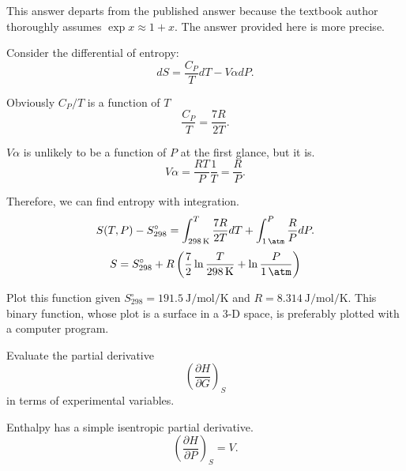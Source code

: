 \begin{@empty}
\begin{answer}
\begin{enumerate}
            This answer departs from the published answer because the textbook
            author thoroughly assumes $\exp x \approx 1 + x$.  The answer
            provided here is more precise.
    \end{enumerate}
\end{answer}

\begin{problem}
\end{problem}

\begin{problem}
\end{problem}

\begin{problem}
\end{problem}

\begin{answer}
    Consider the differential of entropy:
    \[ dS = \frac{C_P}{T} dT - V\alpha dP.\]

    Obviously $C_P / T$ is a function of $T$
    \[ \frac{C_P}{T} = \frac{7R}{2T}.\]

    $V\alpha$ is unlikely to be a function of $P$ at the first glance, but it
    is.
    \[ V\alpha = \frac{RT}{P} \frac{1}{T} = \frac{R}{P}.\]

    Therefore, we can find entropy with integration.
    \[ S(T, P) - S_{298}^\circ = \int_{\SI{298}{\kelvin}}^T \frac{7R}{2T} dT + \int_{\SI{1}{\atm}}^P \frac{R}{P} dP.\]
    \begin{equation}
        S = S_{298}^\circ + R \left( \frac72 \ln\frac{T}{\SI{298}{\kelvin}} + \ln\frac{P}{\SI{1}{\atm}} \right)
        \label{eq:4.14.S}
    \end{equation}

    Plot this function given $S_{298}^\circ = \SI{191.5}{\joule\per\mol\per\kelvin}$
    and $R = \SI{8.314}{\joule\per\mol\per\kelvin}$.  This binary function,
    whose plot is a surface in a 3-D space, is preferably plotted with a
    computer program.
\end{answer}

\begin{problem}
\end{problem}

\begin{problem}
    Evaluate the partial derivative
    \[ \left( \frac{\partial H}{\partial G} \right)_S \]
    in terms of experimental variables.
\end{problem}

\begin{answer}
    Enthalpy has a simple isentropic partial derivative.
    \begin{equation}
       \left( \frac{\partial H}{\partial P} \right)_S = V. \label{eq:HPS}
    \end{equation}


\end{answer}
\end{@empty}
